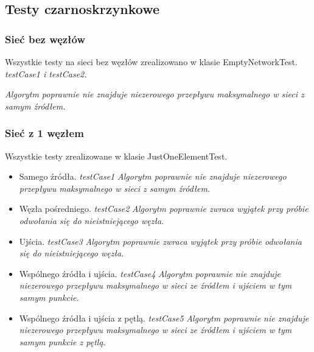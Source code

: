 \subsection{Testy czarno\dywiz skrzynkowe}

\subsubsection{Sieć bez węzłów}
Wszystkie testy na sieci bez węzłów zrealizowano w klasie EmptyNetworkTest.
\emph{testCase1 i testCase2.}

\emph{Algorytm poprawnie nie znajduje niezerowego przepływu maksymalnego w sieci
z samym źródłem.}

\subsubsection{Sieć z 1 węzłem}
Wszystkie testy zrealizowane w klasie JustOneElementTest.
\begin{itemize}[nosep]
    \item Samego źródła.
    \emph{testCase1}
    \emph{Algorytm poprawnie nie znajduje niezerowego przepływu maksymalnego w sieci
    z samym źródłem.}

    \item Węzła pośredniego.
    \emph{testCase2}
    \emph{Algorytm poprawnie zwraca wyjątek przy próbie odwołania się
    do nieistniejącego węzła.}

    \item Ujścia.
    \emph{testCase3}
    \emph{Algorytm poprawnie zwraca wyjątek przy próbie odwołania się
    do nieistniejącego węzła.}

    \item Wspólnego źródła i ujścia.
    \emph{testCase4}
    \emph{Algorytm poprawnie nie znajduje niezerowego
    przepływu maksymalnego w sieci ze źródłem i ujściem w tym samym punkcie.}

    \item Wspólnego źródła i ujścia z pętlą.
    \emph{testCase5}
    \emph{Algorytm poprawnie nie znajduje niezerowego
    przepływu maksymalnego w sieci ze źródłem i ujściem w tym samym punkcie z pętlą.}
\end{itemize}


